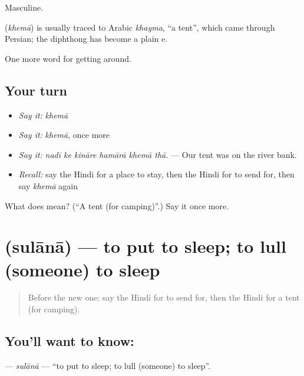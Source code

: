 Masculine.

\begin{cousinweb}
\textbf{} (\emph{khemā}) is usually traced to Arabic \emph{khayma}, \textquotedblleft{}a tent\textquotedblright{}, which came through Persian; the diphthong has become a plain e.
\end{cousinweb}

\begin{grammarlens}[title={What you've built}]
One more word for getting around.
\end{grammarlens}

\subsection*{Your turn}
\begin{itemize}
\raggedright
  \item \emph{Say it:} \emph{khemā}
  \item \emph{Say it:} \emph{khemā}, once more
  \item \emph{Say it:} \emph{nadī ke kināre hamārā khemā thā.} — Our tent was on the river bank.
  \item \emph{Recall:} say the Hindi for a place to stay, then the Hindi for to send for, then say \emph{khemā} again
\end{itemize}

\begin{tcolorbox}[breakable,colback=teal!4,colframe=teal!35!black,title={Before you move on}]
What does  mean? (\textquotedblleft{}A tent (for camping)\textquotedblright{}.) Say it once more.
\end{tcolorbox}
\section[\texorpdfstring{\hi{सुलाना} (sulānā)}{सुलाना (sulānā)}]{ (sulānā) — to put to sleep; to lull (someone) to sleep}

\label{lesson:HI-C416-sulana}



\begin{quote}
Before the new one: say the Hindi for to send for, then the Hindi for a tent (for camping).
\end{quote}

\subsection*{You'll want to know: }
\textbf{} — \emph{sulānā} — \textquotedblleft{}to put to sleep; to lull (someone) to sleep\textquotedblright{}.

